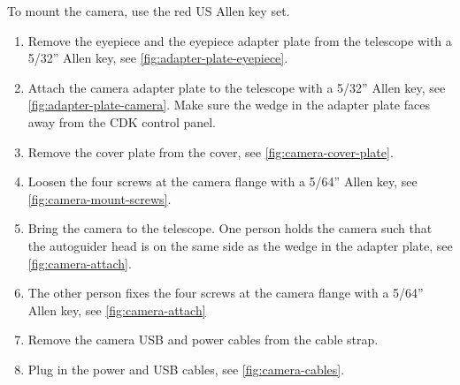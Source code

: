 \documentclass[a4paper, 11pt, fleqn]{memoir}
\begin{document}
To mount the camera, use the red US Allen key set.
\begin{enumerate}
    \item
          Remove the eyepiece and the eyepiece adapter plate from the telescope with a 5/32'' Allen key, see \cref{fig:adapter-plate-eyepiece}.
    \item
          Attach the camera adapter plate to the telescope with a 5/32'' Allen key, see \cref{fig:adapter-plate-camera}.
          Make sure the wedge in the adapter plate faces away from the CDK control panel.
    \item
          Remove the cover plate from the cover, see \cref{fig:camera-cover-plate}.
    \item
          Loosen the four screws at the camera flange with a 5/64'' Allen key, see \cref{fig:camera-mount-screws}.
    \item
          Bring the camera to the telescope.
          One person holds the camera such that the autoguider head is on the same side as the wedge in the adapter plate, see \cref{fig:camera-attach}.
    \item
          The other person fixes the four screws at the camera flange with a 5/64'' Allen key, see \cref{fig:camera-attach}
    \item
          Remove the camera USB and power cables from the cable strap.
    \item
          Plug in the power and USB cables, see \cref{fig:camera-cables}.
\end{enumerate}
\end{document}
